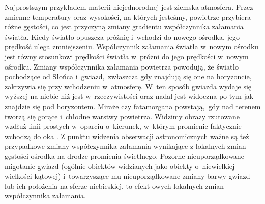 Najprostszym przykładem materii niejednorodnej jest ziemska atmosfera. Przez zmienne temperatury oraz wysokości, na których jesteśmy, powietrze przybiera różne gęstości, co jest przyczyną zmiany gradientu współczynnika załamania światła. Kiedy światło opuszcza próżnię i~wchodzi do nowego ośrodka, jego prędkość ulega zmniejszeniu. Współczynnik załamania światła w~nowym ośrodku jest równy stosunkowi prędkości światła w~próżni do jego prędkości w~nowym ośrodku. Zmiany współczynnika załamania powietrza powodują, że światło pochodzące od Słońca i~gwiazd,~zwłaszcza gdy znajdują się one na horyzoncie, zakrzywia się przy wchodzeniu w~atmosferę. W~ten sposób gwiazda wydaje się wyższej na niebie niż jest w~rzeczywistości oraz nadal jest widoczna po tym jak znajdzie się pod horyzontem. Miraże czy fatamorgana powstają,~gdy nad terenem tworzą się gorące i~chłodne warstwy powietrza. Widzimy obrazy rzutowane wzdłuż linii prostych w~oparciu o~kierunek, w~którym promienie faktycznie wchodzą do oka \cite{katz2002introduction}. Z punktu widzenia obserwacji astronomicznych ważne są też przypadkowe zmiany współczynnika załamania wynikające z lokalnych zmian gęstości ośrodka na drodze promienia świetlnego. Pozorne nieuporządkowane migotanie gwiazd (ogólnie obiektów widzianych jako obiekty o~niewielkiej wielkości kątowej) i~towarzyszące mu nieuporządkowane zmiany barwy gwiazd lub ich położenia na sferze niebieskiej, to efekt owych lokalnych zmian współczynnika załamania.  

